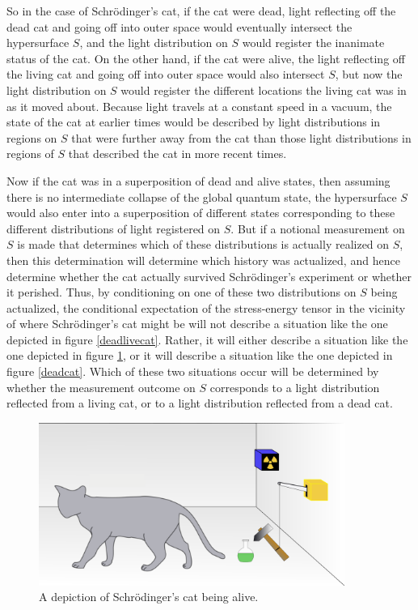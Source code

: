 So in the case of Schr\"{o}dinger's cat, if the cat were dead,  light reflecting off the dead cat and going off into outer space would eventually intersect the hypersurface $S$, and the light distribution on $S$ would register the inanimate status of the cat. On the other hand, if the cat were alive, the light reflecting off the living cat and going off into outer space would also intersect $S$, but now the light distribution on $S$ would register the different locations the living cat was in as it moved about. Because light travels at a constant speed in a vacuum, the state of the cat at earlier times would be described by light distributions in regions on $S$ that were further away from the cat than those light distributions in regions of $S$ that described the cat in more recent times. 

Now if the cat was in a superposition of dead and alive states, then assuming there is no intermediate collapse of the global quantum state,  the hypersurface $S$ would also enter into a superposition of different states corresponding to these different distributions of light registered on $S$. But if a notional measurement on $S$ is made that determines which of these distributions is actually realized on $S$, then this determination will determine which history was actualized, and hence determine whether the cat actually survived Schr\"{o}dinger's experiment or whether it perished.   Thus, by conditioning on one of these two distributions on $S$ being actualized, the conditional expectation of the stress-energy tensor in the vicinity of where Schr\"{o}dinger's cat might be 
will not describe a situation like the one depicted in figure \ref{deadlivecat}.   Rather, it will either describe a situation like the one depicted in figure \ref{livecat}, or it will describe a situation like the one depicted in figure \ref{deadcat}. Which of these two situations occur will be determined by whether the measurement outcome on $S$ corresponds to a light distribution reflected from a living cat, or to a light distribution reflected from a dead cat. 
\begin{figure}[ht!]
  \captionsetup{justification=justified}
  \centering
  \includegraphics[width=100mm]{Chapter03/Schrodingers_livecat.png}
  \caption[Depiction of Schr\"{o}dinger's living cat]{A depiction of Schr\"{o}dinger's cat being alive.\protect\footnotemark}
  \label{livecat}
  \end{figure}

